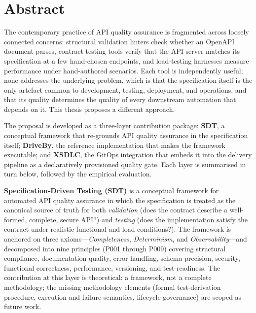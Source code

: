 \chapter*{Abstract}

The contemporary practice of API quality assurance is fragmented across loosely connected concerns: structural validation linters check whether an OpenAPI document parses, contract-testing tools verify that the API server matches its specification at a few hand-chosen endpoints, and load-testing harnesses measure performance under hand-authored scenarios. Each tool is independently useful; none addresses the underlying problem, which is that the specification itself is the only artefact common to development, testing, deployment, and operations, and that its quality determines the quality of every downstream automation that depends on it. This thesis proposes a different approach.

The proposal is developed as a three-layer contribution package: \textbf{SDT}, a conceptual framework that re-grounds API quality assurance in the specification itself; \textbf{DriveBy}, the reference implementation that makes the framework executable; and \textbf{XSDLC}, the GitOps integration that embeds it into the delivery pipeline as a declaratively provisioned quality gate. Each layer is summarised in turn below, followed by the empirical evaluation.

\textbf{Specification-Driven Testing (SDT)} is a conceptual framework for automated API quality assurance in which the specification is treated as the canonical source of truth for both \emph{validation} (does the contract describe a well-formed, complete, secure API?) and \emph{testing} (does the implementation satisfy the contract under realistic functional and load conditions?). The framework is anchored on three axioms---\emph{Completeness}, \emph{Determinism}, and \emph{Observability}---and decomposed into nine principles (P001 through P009) covering structural compliance, documentation quality, error-handling, schema precision, security, functional correctness, performance, versioning, and test-readiness. The contribution at this layer is theoretical: a framework, not a complete methodology; the missing methodology elements (formal test-derivation procedure, execution and failure semantics, lifecycle governance) are scoped as future work.


